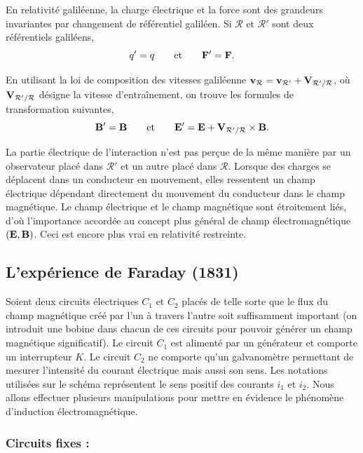 \documentclass[11pt,a4paper]{report}
\begin{document}
En relativité galiléenne, la charge électrique et la force sont des grandeurs invariantes par changement de référentiel galiléen. Si $\mathcal{R}$ et $\mathcal{R}'$ sont deux référentiels galiléens,
\begin{equation}
	q' = q \qquad \text{et} \qquad \bold{F}' = \bold{F}. 
\end{equation}

En utilisant la loi de composition des vitesses galiléenne $\bold{v}_{\mathcal{R}} = \bold{v}_{\mathcal{R}'} + \bold{V}_{\mathcal{R}'/\mathcal{R}}$, où $\bold{V}_{\mathcal{R}'/\mathcal{R}}$ désigne la vitesse d'entraînement, on trouve les formules de transformation suivantes,
\begin{equation}
	\bold{B}' = \bold{B} \qquad \text{et} \qquad \bold{E}' = \bold{E} + \bold{V}_{\mathcal{R}'/\mathcal{R}}\times\bold{B}.
\end{equation}

La partie électrique de l'interaction n'est pas perçue de la même manière par un observateur placé dans $\mathcal{R}'$ et un autre placé dans $\mathcal{R}$. Lorsque des charges se déplacent dans un conducteur en mouvement, elles ressentent un champ électrique dépendant directement du mouvement du conducteur dans le champ magnétique. Le champ électrique et le champ magnétique sont étroitement liés, d'où l'importance accordée au concept plus général de champ électromagnétique $(\bold{E},\bold{B})$. Ceci est encore plus vrai en relativité restreinte.

\subsection{L'expérience de Faraday (1831)}

Soient deux circuits électriques $C_1$ et $C_2$ placés de telle sorte que le flux du champ magnétique créé par l'un à travers l'autre soit suffisamment important (on introduit une bobine dans chacun de ces circuits pour pouvoir générer un champ magnétique significatif). Le circuit $C_1$ est alimenté par un générateur et comporte un interrupteur $K$. Le circuit $C_2$ ne comporte qu'un galvanomètre permettant de mesurer l'intensité du courant électrique mais aussi son sens. Les notations utilisées sur le schéma représentent le sens positif des courants $i_1$ et $i_2$. Nous allons effectuer plusieurs manipulations pour mettre en évidence le phénomène d'induction électromagnétique.\\

\subsubsection{Circuits fixes :}
\end{document}
